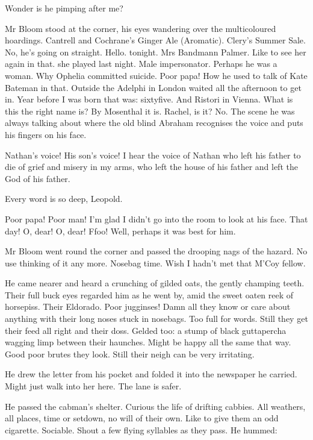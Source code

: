 Wonder is he pimping after me?

Mr Bloom stood at the corner,
his eyes wandering over the multicoloured hoardings.
Cantrell and Cochrane's Ginger Ale (Aromatic).
Clery's Summer Sale.
No, he's going on straight.
Hello.
 tonight.
Mrs Bandmann Palmer.
Like to see her again in that.
 she played last night.
Male impersonator.
Perhaps he was a woman.
Why Ophelia committed suicide.
Poor papa!
How he used to talk of Kate Bateman in that.
Outside the Adelphi in London
waited all the afternoon to get in.
Year before I was born
that was:
sixtyfive.
And Ristori in Vienna.
What is this the right name is?
By Mosenthal it is.
Rachel, is it?
No.
The scene he was always talking about
where the old blind Abraham recognises the voice
and puts his fingers on his face.

Nathan's voice!
His son's voice!
I hear the voice of Nathan who left his father
to die of grief and misery in my arms,
who left the house of his father
and left the God of his father.

Every word is so deep, Leopold.

Poor papa!
Poor man!
I'm glad I didn't go into the room to look at his face.
That day!
O, dear!
O, dear!
Ffoo!
Well, perhaps it was best for him.

Mr Bloom went round the corner
and passed the drooping nags of the hazard.
No use thinking of it any more.
Nosebag time.
Wish I hadn't met that M'Coy fellow.

He came nearer and heard a crunching of gilded oats,
the gently champing teeth.
Their full buck eyes regarded him as he went by,
amid the sweet oaten reek of horsepiss.
Their Eldorado.
Poor jugginses!
Damn all they know or care about anything
with their long noses stuck in nosebags.
Too full for words.
Still they get their feed all right and their doss.
Gelded too:
a stump of black guttapercha wagging limp between their haunches.
Might be happy all the same that way.
Good poor brutes they look.
Still their neigh can be very irritating.

He drew the letter from his pocket
and folded it into the newspaper he carried.
Might just walk into her here.
The lane is safer.

He passed the cabman's shelter.
Curious the life of drifting cabbies.
All weathers, all places,
time or setdown,
no will of their own.
Like to give them an odd cigarette.
Sociable.
Shout a few flying syllables as they pass.
He hummed:


